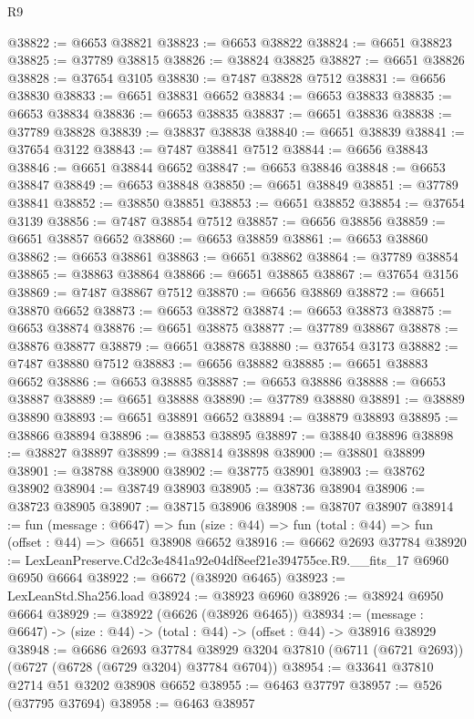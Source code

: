 \begin{lexlean}{R9}
\begin{coremodule}
@38822 := @6653 @38821
@38823 := @6653 @38822
@38824 := @6651 @38823
@38825 := @37789 @38815
@38826 := @38824 @38825
@38827 := @6651 @38826
@38828 := @37654 @3105
@38830 := @7487 @38828 @7512
@38831 := @6656 @38830
@38833 := @6651 @38831 @6652
@38834 := @6653 @38833
@38835 := @6653 @38834
@38836 := @6653 @38835
@38837 := @6651 @38836
@38838 := @37789 @38828
@38839 := @38837 @38838
@38840 := @6651 @38839
@38841 := @37654 @3122
@38843 := @7487 @38841 @7512
@38844 := @6656 @38843
@38846 := @6651 @38844 @6652
@38847 := @6653 @38846
@38848 := @6653 @38847
@38849 := @6653 @38848
@38850 := @6651 @38849
@38851 := @37789 @38841
@38852 := @38850 @38851
@38853 := @6651 @38852
@38854 := @37654 @3139
@38856 := @7487 @38854 @7512
@38857 := @6656 @38856
@38859 := @6651 @38857 @6652
@38860 := @6653 @38859
@38861 := @6653 @38860
@38862 := @6653 @38861
@38863 := @6651 @38862
@38864 := @37789 @38854
@38865 := @38863 @38864
@38866 := @6651 @38865
@38867 := @37654 @3156
@38869 := @7487 @38867 @7512
@38870 := @6656 @38869
@38872 := @6651 @38870 @6652
@38873 := @6653 @38872
@38874 := @6653 @38873
@38875 := @6653 @38874
@38876 := @6651 @38875
@38877 := @37789 @38867
@38878 := @38876 @38877
@38879 := @6651 @38878
@38880 := @37654 @3173
@38882 := @7487 @38880 @7512
@38883 := @6656 @38882
@38885 := @6651 @38883 @6652
@38886 := @6653 @38885
@38887 := @6653 @38886
@38888 := @6653 @38887
@38889 := @6651 @38888
@38890 := @37789 @38880
@38891 := @38889 @38890
@38893 := @6651 @38891 @6652
@38894 := @38879 @38893
@38895 := @38866 @38894
@38896 := @38853 @38895
@38897 := @38840 @38896
@38898 := @38827 @38897
@38899 := @38814 @38898
@38900 := @38801 @38899
@38901 := @38788 @38900
@38902 := @38775 @38901
@38903 := @38762 @38902
@38904 := @38749 @38903
@38905 := @38736 @38904
@38906 := @38723 @38905
@38907 := @38715 @38906
@38908 := @38707 @38907
@38914 := fun (message : @6647) =>
  fun (size : @44) => fun (total : @44) => fun (offset : @44) => @6651 @38908 @6652
@38916 := @6662 @2693 @37784
@38920 := LexLeanPreserve.Cd2c3e4841a92e04df8eef21e394755ce.R9.__fits_17 @6960 @6950 @6664
@38922 := @6672 (@38920 @6465)
@38923 := LexLeanStd.Sha256.load
@38924 := @38923 @6960
@38926 := @38924 @6950 @6664
@38929 := @38922 (@6626 (@38926 @6465))
@38934 := (message : @6647) -> (size : @44) -> (total : @44) -> (offset : @44) -> @38916 @38929
@38948 := @6686
    @2693
    @37784
    @38929
    @3204
    @37810
    (@6711 (@6721 @2693))
    (@6727 (@6728 (@6729 @3204) @37784 @6704))
@38954 := @33641 @37810 @2714 @51 @3202 @38908 @6652
@38955 := @6463 @37797
@38957 := @526 (@37795 @37694)
@38958 := @6463 @38957

\end{coremodule}
\end{lexlean}
